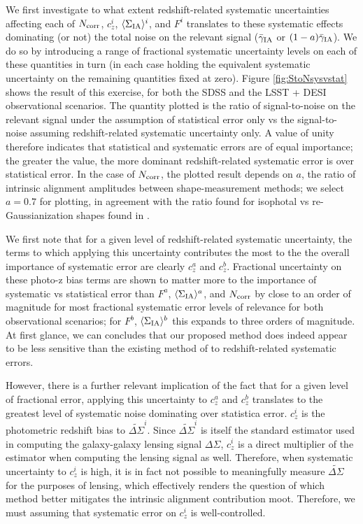 \documentclass[a4paper,fleqn,usenatbib]{mnras}
\begin{document}
We first investigate to what extent redshift-related systematic uncertainties affecting each of $N_{\rm corr}$, $c_z^i$, $\langle \Sigma_{\rm IA} \rangle^i$, and $F^i$ translates to these systematic effects dominating (or not) the total noise on the relevant signal ($\bar{\gamma}_{\rm IA}$ or $(1-a)\bar{\gamma}_{\rm IA}$). We do so by introducing a range of fractional systematic uncertainty levels on each of these quantities in turn (in each case holding the equivalent systematic uncertainty on the remaining quantities fixed at zero). Figure \ref{fig:StoNsysvstat} shows the result of this exercise, for both the SDSS and the LSST + DESI observational scenarios. The quantity plotted is the ratio of signal-to-noise on the relevant signal under the assumption of statistical error only vs the signal-to-noise assuming redshift-related systematic uncertainty only. A value of unity therefore indicates that statistical and systematic errors are of equal importance; the greater the value, the more dominant redshift-related systematic error is over statistical error. In the case of $N_{\rm corr}$, the plotted result depends on $a$, the ratio of intrinsic alignment amplitudes between shape-measurement methods; we select $a=0.7$ for plotting, in agreement with the ratio found for isophotal vs re-Gaussianization shapes found in \cite{Singh2016}.

We first note that for a given level of redshift-related systematic uncertainty, the terms to which applying this uncertainty contributes the most to the the overall importance of systematic error are clearly $c_z^a$ and $c_z^b$. Fractional uncertainty on these photo-z bias terms are shown to matter more to the importance of systematic vs statistical error than $F^a$, $\langle \Sigma_{\rm IA} \rangle^a$, and $N_{\rm corr}$ by close to an order of magnitude for most fractional systematic error levels of relevance for both observational scenarios; for $F^b$, $\langle \Sigma_{\rm IA} \rangle^b$ this expands to three orders of magnitude. At first glance, we can concludes that our proposed method does indeed appear to be less sensitive than the existing method of \cite{Blazek2012} to redshift-related systematic errors.

However, there is a further relevant implication of the fact that for a given level of fractional error, applying this uncertainty to $c_z^a$ and $c_z^b$ translates to the greatest level of systematic noise dominating over statistica error. $c_z^i$ is the photometric redshift bias to $\widetilde{\Delta \Sigma}^i$. Since $\widetilde{\Delta \Sigma}^i$ is itself the standard estimator used in computing the galaxy-galaxy lensing signal $\Delta \Sigma$, $c_z^i$ is a direct multiplier of the estimator when computing the lensing signal as well. Therefore, when systematic uncertainty to $c_z^i$ is high, it is in fact not possible to meaningfully measure $\tilde{\Delta \Sigma}$ for the purposes of lensing, which effectively renders the question of which method better mitigates the intrinsic alignment contribution moot. Therefore, we must assuming that systematic error on $c_z^i$ is well-controlled.
 
\end{document}
